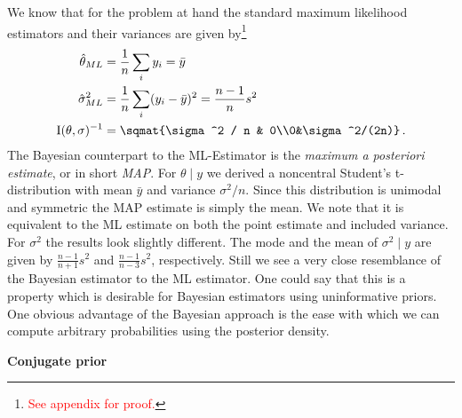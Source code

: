 We know that for the problem at hand the standard maximum likelihood estimators
and their variances are given by\footnote{\textcolor{red}{See appendix for proof.}}
\begin{align}
  \hat{\theta}_{ML} &= \frac{1}{n} \sum_i y_i = \bar{y}\,\\
  \hat{\sigma}_{ML}^2 &= \frac{1}{n} \sum_i (y_i - \bar{y})^2 = \frac{n-1}{n} s^2\,\\
  \mathrm{I}(\theta, \sigma)^{-1} &= \sqmat{\sigma^2 / n & 0\\0&\sigma^2/(2n)} \,.
\end{align}
The Bayesian counterpart to the ML-Estimator is the \emph{maximum a posteriori estimate},
or in short \emph{MAP}. For $\theta \mid y$ we derived a noncentral Student's t-distribution
with mean $\bar{y}$ and variance $\sigma^2/n$. Since this distribution is unimodal and
symmetric the MAP estimate is simply the mean. We note that it is equivalent to
the ML estimate on both the point estimate and included variance. For $\sigma^2$
the results look slightly different. The mode and the mean of $\sigma^2 \mid y$
are given by $\frac{n-1}{n+1} s^2$ and $\frac{n-1}{n-3} s^2$, respectively.
Still we see a very close resemblance of the Bayesian estimator to the ML estimator.
One could say that this is a property which is desirable for Bayesian estimators
using uninformative priors. One obvious advantage of the Bayesian approach is the
ease with which we can compute arbitrary probabilities using the posterior density.


\textbf{Conjugate prior}
